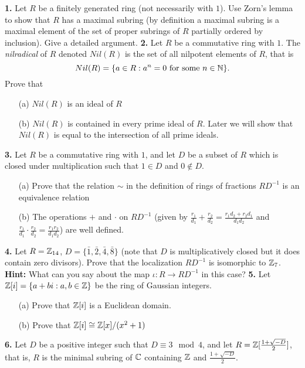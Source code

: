 \documentclass[12pt]{amsart}
\begin{document}
{\bf 1.} Let $R$ be a finitely generated ring (not necessarily with $1$). Use Zorn's lemma to show that $R$ has a  
maximal subring (by definition a maximal subring is a maximal element of the set of  
proper subrings of $R$ partially ordered by inclusion). Give a detailed argument. 
\skv
{\bf 2.} Let $R$ be a commutative ring with $1$. The {\it nilradical} of $R$ denoted $Nil(R)$ is the set of all nilpotent elements of $R$, that is $$Nil(R)=\{a\in R : a^n=0 \mbox{ for some }n\in{\mathbb N}\}.$$ Prove that 
\begin{itemize}
\item[(a)] $Nil(R)$ is an ideal of $R$ 
\item[(b)] $Nil(R)$ is contained in every prime ideal of $R$. Later we will show that $Nil(R)$ is equal to the intersection of all prime ideals.
\end{itemize}
\skv
{\bf 3.} Let $R$ be a commutative ring with $1$, and let $D$ be a subset of $R$ which is closed under multiplication such that 
$1\in D$ and $0\not\in D$.
\begin{itemize}
\item[(a)] Prove that the relation $\sim$ in the definition of rings of fractions $RD^{-1}$ is an equivalence relation
\item[(b)] The operations $+$ and $\cdot$ on $RD^{-1}$ (given by $\frac{r_1}{d_1}+\frac{r_2}{d_2}=\frac{r_1 d_2+r_2 d_1}{d_1 d_2}$
and $\frac{r_1}{d_1}\cdot\frac{r_2}{d_2}=\frac{r_1 r_2}{d_1 d_2}$) are well defined.
\end{itemize}
\skv
{\bf 4.} Let $R={\mathbb Z}_{14}$, $D=\{\bar 1,\bar 2,\bar 4,\bar 8\}$ (note that $D$ is multiplicatively closed
but it does contain zero divisors). Prove that the localization $RD^{-1}$ is isomorphic to ${\mathbb Z}_{7}$.
{\bf Hint:} What can you say about the map $\iota:R\to RD^{-1}$ in this case?
\skv
\skv
{\bf 5.} Let ${\mathbb Z}[i]=\{a+bi: a,b\in{\mathbb Z}\}$ be the ring of Gaussian integers.
\begin{itemize}
\item[(a)] Prove that ${\mathbb Z}[i]$ is a Euclidean domain.
\item[(b)] Prove that ${\mathbb Z}[i]\cong {\mathbb Z}[x]/(x^2+1)$
\end{itemize}
\skv
{\bf 6.} Let $D$ be a positive integer such that $D\equiv 3\mod 4$, and let
$R={\mathbb Z}[\frac{1+\sqrt{-D}}{2}]$, that is, $R$ is the minimal subring of ${\mathbb C}$ containing ${\mathbb Z}$ and $\frac{1+\sqrt{-D}}{2}$.
\end{document}
